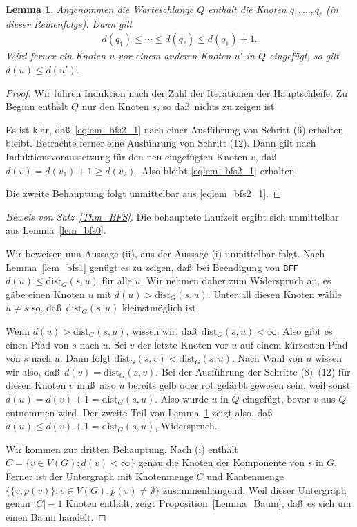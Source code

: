\documentclass[10pt,reqno]{amsart}
\numberwithin{equation}{section}
\newtheorem{lemma}[definition]{Lemma}
\newcommand\dist{\mathrm{dist}}
\newcommand\Lem{Lemma}
\newcommand\Prop{Proposition}
\newcommand\Thm{Satz}
\begin{document}
\begin{lemma}\label{lem_bfs2}
	Angenommen die Warteschlange $Q$ enth\"alt die Knoten $q_1,\ldots,q_\ell$ (in dieser Reihenfolge).
	Dann gilt 
	\begin{align}\label{eqlem_bfs2_1}
	d(q_1)\leq\cdots\leq d(q_\ell)\leq d(q_1)+1.
	\end{align}
	Wird ferner ein Knoten $u$ vor einem anderen Knoten $u'$ in $Q$ eingef\"ugt, so gilt $d(u)\leq d(u')$.
\end{lemma}
\begin{proof}
	Wir f\"uhren Induktion nach der Zahl der Iterationen der Hauptschleife.
	Zu Beginn enth\"alt $Q$ nur den Knoten $s$, so da\ss\ nichts zu zeigen ist.

	Es ist klar, da\ss\ \eqref{eqlem_bfs2_1} nach einer Ausf\"uhrung von Schritt (6) erhalten bleibt.
	Betrachte ferner eine Ausf\"uhrung von Schritt (12).
	Dann gilt nach Induktionsvoraussetzung f\"ur den neu eingef\"ugten Knoten $v$, da\ss\ $d(v)=d(v_1)+1\geq d(v_2)$.
	Also bleibt \eqref{eqlem_bfs2_1} erhalten.

	Die zweite Behauptung folgt unmittelbar aus \eqref{eqlem_bfs2_1}.
\end{proof}

\begin{proof}[Beweis von \Thm~\ref{Thm_BFS}]
	Die behauptete Laufzeit ergibt sich unmittelbar aus \Lem~\ref{lem_bfs0}.

	Wir beweisen nun Aussage (ii), aus der Aussage (i) unmittelbar folgt.
Nach \Lem~\ref{lem_bfs1} gen\"ugt es zu zeigen, da\ss\ bei Beendigung von {\tt BFF} $d(u)\leq\dist_G(s,u)$ f\"ur alle $u$.
	Wir nehmen daher zum Widerspruch an, es g\"abe einen Knoten $u$ mit $d(u)>\dist_G(s,u)$.
	Unter all diesen Knoten w\"ahle $u\neq s$ so, da\ss\ $\dist_G(s,u)$ kleinstm\"oglich ist.

	Wenn $d(u)>\dist_G(s,u)$, wissen wir, da\ss\ $\dist_G(s,u)<\infty$.
	Also gibt es einen Pfad von $s$ nach $u$.
	Sei $v$ der letzte Knoten vor $u$ auf einem k\"urzesten Pfad von $s$ nach $u$.
	Dann folgt $\dist_G(s,v)<\dist_G(s,u)$.
	Nach Wahl von $u$ wissen wir also, da\ss\ $d(v)=\dist_G(s,v)$.
	Bei der Ausf\"uhrung der Schritte (8)--(12) f\"ur diesen Knoten $v$ mu\ss\ also $u$ bereits gelb oder rot gef\"arbt gewesen sein, weil sonst $d(u)=d(v)+1=\dist_G(s,u)$.
	Also wurde $u$ in $Q$ eingef\"ugt, bevor $v$ aus $Q$ entnommen wird.
	Der zweite Teil von \Lem~\ref{lem_bfs2} zeigt also, da\ss\ $d(u)\leq d(v)+1=\dist_G(s,u)$, Widerspruch.

	Wir kommen zur dritten Behauptung.
	Nach (i) enth\"alt $C=\{v\in V(G):d(v)<\infty\}$ genau die Knoten der Komponente von $s$ in $G$.
	Ferner ist der Untergraph mit Knotenmenge $C$ und Kantenmenge $\{\{v,p(v)\}:v\in V(G),p(v)\neq\emptyset\}$ zusammenh\"angend.
	Weil dieser Untergraph genau $|C|-1$ Knoten enth\"alt, zeigt \Prop~\ref{Lemma_Baum}, da\ss\ es sich um einen Baum handelt.
\end{proof}
\end{document}
